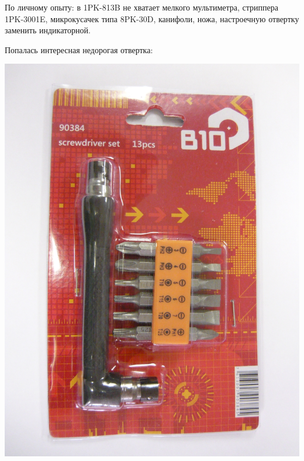 {По личному опыту: в 1PK-813B не хватает мелкого мультиметра, стриппера
1PK-3001E, микрокусачек типа 8PK-30D, канифоли, ножа, настроечную отвертку
заменить индикаторной.


Попалась интересная недорогая отвертка:

\begin{multicols}{2}
\noindent\includegraphics[width=\columnwidth]{00/fig/P1020966.jpg}
\columnbreak

\end{multicols}}
